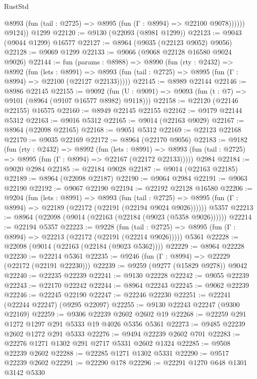 \begin{lexlean}{RustStd}
\begin{coremodule}
              @8993 (fun (tail : @2725) => @8995 (fun (Γ : @8994) => @22100 @9078))))))
        @9124))
    @1299
@22120 := @9130 (@22093 (@8981 @1299))
@22123 := @9043 (@9044 @1299) @16577
@22127 := @8964 (@9035 (@22123 @9052) @9056)
@22128 := @9069 @1299
@22133 := @9066 (@9068 @22128 @16580 @9024 @9026)
@22144 := fun (params : @8988) =>
  @8990
    (fun (rty : @2432) =>
    @8992
      (fun (lets : @8991) =>
      @8993 (fun (tail : @2725) => @8995 (fun (Γ : @8994) => @22100 (@22127 @22133)))))
@22145 := @8989 @22144
@22146 := @8986 @22145
@22155 := @9092
    (fun (U : @9091) => @9093 (fun (t : @7) => @9101 (@8964 (@9107 @16577 @8982) @9118)))
@22158 := @22120 (@22146 @22155) @16575
@22160 := @8949 @22145 @22155
@22162 := @9179 @22144 @5312
@22163 := @9016 @5312
@22165 := @9014 (@22163 @9029)
@22167 := @8964 (@22098 @22165)
@22168 := @9051 @5312
@22169 := @22123 @22168
@22170 := @9035 @22169
@22172 := @8964 (@22170 @9056)
@22183 := @9182
    (fun (rty : @2432) =>
    @8992
      (fun (lets : @8991) =>
      @8993 (fun (tail : @2725) => @8995 (fun (Γ : @8994) => @22167 (@22172 @22133)))))
    @2984
@22184 := @9020 @2984
@22185 := @22184 @9028
@22187 := @9014 (@22163 @22185)
@22189 := @8964 (@22098 @22187)
@22190 := @9064 @2984
@22191 := @9063 @22190
@22192 := @9067 @22190
@22194 := @22192 @22128 @16580
@22206 := @9204
    (fun (lets : @8991) =>
    @8993
      (fun (tail : @2725) =>
      @8995 (fun (Γ : @8994) => @22189 (@22172 (@22191 (@22194 @9024 @9026))))))
    @5357
@22213 := @8964 (@22098 (@9014 (@22163 (@22184 (@9023 (@5358 @9026))))))
@22214 := @22194 @5357
@22223 := @9228
    (fun (tail : @2725) => @8995 (fun (Γ : @8994) => @22213 (@22172 (@22191 (@22214 @9026)))))
    @5361
@22228 := @22098 (@9014 (@22163 (@22184 (@9023 @5362))))
@22229 := @8964 @22228
@22230 := @22214 @5361
@22235 := @9246 (fun (Γ : @8994) => @22229 (@22172 (@22191 @22230)))
@22239 := @9259 (@9277 (@15829 @9278)) @9042
@22240 := @22235 @22239
@22241 := @9130 @22228
@22242 := @9055 @22239
@22243 := @22170 @22242
@22244 := @8964 @22243
@22245 := @9062 @22239
@22246 := @22245 @22190
@22247 := @22246 @22230
@22251 := @22241 (@22244 @22247) (@9295 @22097)
@22255 := @9130 @22243 @22247 (@9300 @22169)
@22259 := @9306 @22239 @2602 @2602 @19
@22268 := @22259 @291 @1272 @1297 @291 @5333 @19 @4026 @5356 @5361
@22273 := @9485 @22239 @2602 @1272 @291 @5333
@22276 := @9494 @22239 @2602 @701
@22283 := @22276 @1271 @1302 @291 @2717 @5331 @2602 @1324
@22285 := @9508 @22239 @2602
@22288 := @22285 @1271 @1302 @5331
@22290 := @9517 @22239 @2602
@22291 := @22290 @178
@22296 := @22291 @1270 @648 @1301 @3142 @5330

\end{coremodule}
\end{lexlean}
